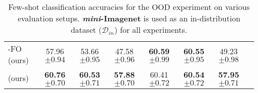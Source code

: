 \begin{table*}[!htbp]
{\begin{tabular}{l|ccc|cccc}
        \sysname{}-FO (ours) & 
        57.96$\scriptstyle{\pm 0.94}$& 53.66$\scriptstyle{\pm 0.95}$& 47.58$\scriptstyle{\pm 0.96}$& 
        \textbf{60.59}$\scriptstyle{\pm 0.99}$ & 
        \textbf{60.55}$\scriptstyle{\pm 0.95}$& 
        49.23$\scriptstyle{\pm 0.98}$  \\
        \sysname{} (ours) & \textbf{60.76}$\scriptstyle{\pm 0.70}$& 
        \textbf{60.53}$\scriptstyle{\pm 0.71}$& \textbf{57.88}$\scriptstyle{\pm 0.70}$& 
        60.41$\scriptstyle{\pm 0.72}$ & 
        \textbf{60.54}$\scriptstyle{\pm 0.72}$& 
        \textbf{57.95}$\scriptstyle{\pm 0.71}$  \\
        \bottomrule
    \end{tabular}}
    \vspace{-2mm}
    \caption{Few-shot classification accuracies for the OOD experiment on various evaluation setups. \textbf{\textit{mini}-Imagenet} is used as an in-distribution dataset ($\mathcal{D}_{in}$) for all experiments. 
    }
    \label{tab:ood-classification}
    \vspace{-3mm}

\end{table*}

